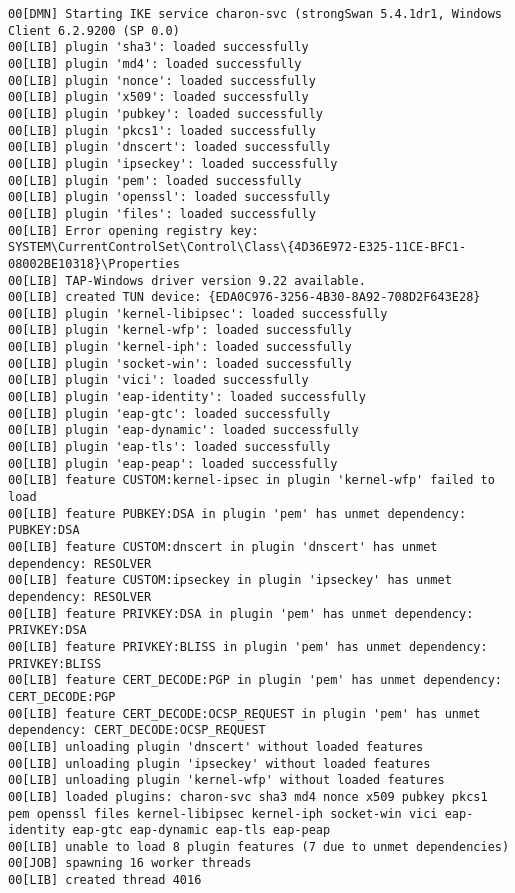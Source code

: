 \begin{lstlisting}[caption=Debug-Log; Zeigt Problematik mit WaitForSingleObject(),label=lst:debug-log]
00[DMN] Starting IKE service charon-svc (strongSwan 5.4.1dr1, Windows Client 6.2.9200 (SP 0.0)
00[LIB] plugin 'sha3': loaded successfully
00[LIB] plugin 'md4': loaded successfully
00[LIB] plugin 'nonce': loaded successfully
00[LIB] plugin 'x509': loaded successfully
00[LIB] plugin 'pubkey': loaded successfully
00[LIB] plugin 'pkcs1': loaded successfully
00[LIB] plugin 'dnscert': loaded successfully
00[LIB] plugin 'ipseckey': loaded successfully
00[LIB] plugin 'pem': loaded successfully
00[LIB] plugin 'openssl': loaded successfully
00[LIB] plugin 'files': loaded successfully
00[LIB] Error opening registry key: SYSTEM\CurrentControlSet\Control\Class\{4D36E972-E325-11CE-BFC1-08002BE10318}\Properties
00[LIB] TAP-Windows driver version 9.22 available.
00[LIB] created TUN device: {EDA0C976-3256-4B30-8A92-708D2F643E28}
00[LIB] plugin 'kernel-libipsec': loaded successfully
00[LIB] plugin 'kernel-wfp': loaded successfully
00[LIB] plugin 'kernel-iph': loaded successfully
00[LIB] plugin 'socket-win': loaded successfully
00[LIB] plugin 'vici': loaded successfully
00[LIB] plugin 'eap-identity': loaded successfully
00[LIB] plugin 'eap-gtc': loaded successfully
00[LIB] plugin 'eap-dynamic': loaded successfully
00[LIB] plugin 'eap-tls': loaded successfully
00[LIB] plugin 'eap-peap': loaded successfully
00[LIB] feature CUSTOM:kernel-ipsec in plugin 'kernel-wfp' failed to load
00[LIB] feature PUBKEY:DSA in plugin 'pem' has unmet dependency: PUBKEY:DSA
00[LIB] feature CUSTOM:dnscert in plugin 'dnscert' has unmet dependency: RESOLVER
00[LIB] feature CUSTOM:ipseckey in plugin 'ipseckey' has unmet dependency: RESOLVER
00[LIB] feature PRIVKEY:DSA in plugin 'pem' has unmet dependency: PRIVKEY:DSA
00[LIB] feature PRIVKEY:BLISS in plugin 'pem' has unmet dependency: PRIVKEY:BLISS
00[LIB] feature CERT_DECODE:PGP in plugin 'pem' has unmet dependency: CERT_DECODE:PGP
00[LIB] feature CERT_DECODE:OCSP_REQUEST in plugin 'pem' has unmet dependency: CERT_DECODE:OCSP_REQUEST
00[LIB] unloading plugin 'dnscert' without loaded features
00[LIB] unloading plugin 'ipseckey' without loaded features
00[LIB] unloading plugin 'kernel-wfp' without loaded features
00[LIB] loaded plugins: charon-svc sha3 md4 nonce x509 pubkey pkcs1 pem openssl files kernel-libipsec kernel-iph socket-win vici eap-identity eap-gtc eap-dynamic eap-tls eap-peap
00[LIB] unable to load 8 plugin features (7 due to unmet dependencies)
00[JOB] spawning 16 worker threads
00[LIB] created thread 4016

\end{lstlisting}
